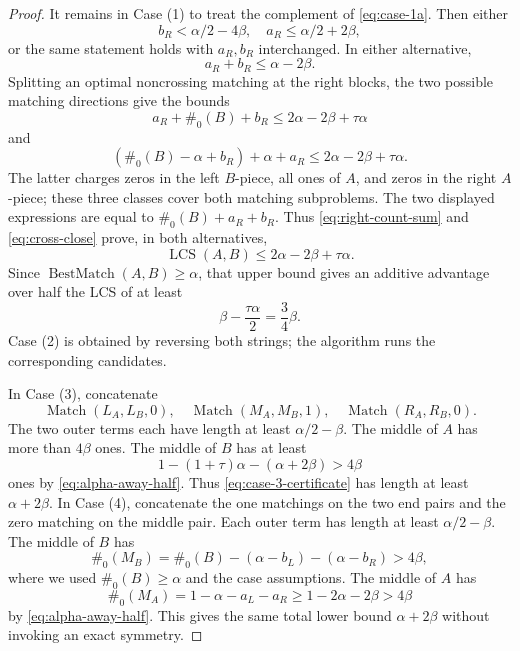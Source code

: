 \documentclass[11pt]{article}
\theoremstyle{remark}
\newcommand{\LCS}{\operatorname{LCS}}
\newcommand{\BestMatch}{\operatorname{BestMatch}}
\newcommand{\Match}{\operatorname{Match}}
\begin{document}
\begin{proof}
It remains in Case (1) to treat the complement of
\eqref{eq:case-1a}.  Then either
\[
 b_R<\alpha/2-4\beta,\quad a_R\le\alpha/2+2\beta,
\]
or the same statement holds with $a_R,b_R$ interchanged.  In either
alternative,
\begin{equation}\label{eq:right-count-sum}
 a_R+b_R\le\alpha-2\beta.
\end{equation}
Splitting an optimal noncrossing matching at the right blocks, the two
possible matching directions give the bounds
\[
 a_R+\#_0(B)+b_R
 \le2\alpha-2\beta+\tau\alpha
\]
and
\[
 (\#_0(B)-\alpha+b_R)+\alpha+a_R
 \le2\alpha-2\beta+\tau\alpha.
\]
The latter charges zeros in the left $B$-piece, all ones of $A$, and
zeros in the right $A$-piece; these three classes cover both matching
subproblems.
The two displayed expressions are equal to
$\#_0(B)+a_R+b_R$.  Thus \eqref{eq:right-count-sum} and
\eqref{eq:cross-close} prove, in both alternatives,
\begin{equation}\label{eq:case-1bc-upper}
 \LCS(A,B)\le2\alpha-2\beta+\tau\alpha.
\end{equation}
Since
$\BestMatch(A,B)\ge\alpha$, that upper bound gives an additive advantage over
half the LCS of at least
\begin{equation}\label{eq:case-1bc-gain}
 \beta-\frac{\tau\alpha}{2}=\frac34\beta.
\end{equation}
Case (2) is obtained by reversing both strings; the algorithm runs the
corresponding candidates.

In Case (3), concatenate
\begin{equation}\label{eq:case-3-certificate}
 \Match(L_A,L_B,0),\quad \Match(M_A,M_B,1),\quad
 \Match(R_A,R_B,0).
\end{equation}
The two outer terms each have length at least
$\alpha/2-\beta$.  The middle of $A$ has more than $4\beta$ ones.
The middle of $B$ has at least
\[
 1-(1+\tau)\alpha-(\alpha+2\beta)>4\beta
\]
ones by \eqref{eq:alpha-away-half}.  Thus
\eqref{eq:case-3-certificate} has length at least
$\alpha+2\beta$.  In Case (4), concatenate the one matchings on the
two end pairs and the zero matching on the middle pair.  Each outer
term has length at least $\alpha/2-\beta$.  The middle of $B$ has
\[
 \#_0(M_B)=\#_0(B)-(\alpha-b_L)-(\alpha-b_R)>4\beta,
\]
where we used $\#_0(B)\ge\alpha$ and the case assumptions.  The
middle of $A$ has
\[
 \#_0(M_A)=1-\alpha-a_L-a_R
 \ge1-2\alpha-2\beta>4\beta
\]
by \eqref{eq:alpha-away-half}.  This gives the same total lower bound
$\alpha+2\beta$ without invoking an exact symmetry.


\end{proof}
\end{document}
